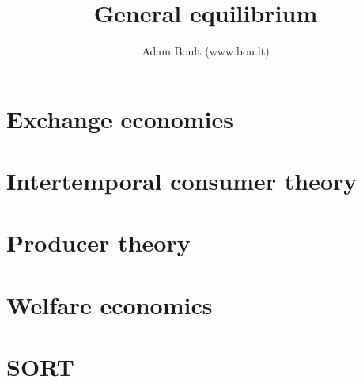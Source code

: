 \documentclass[oneside]{book}
\begin{document}
\author{Adam Boult (www.bou.lt)}
\title{General equilibrium}
\maketitle

\setcounter{tocdepth}{0}
\tableofcontents



\part{Exchange economies}





\part{Intertemporal consumer theory}






\part{Producer theory}




\part{Welfare economics}





\part{SORT}

\end{document}
